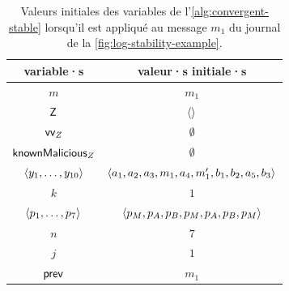 \begin{table}[ht]
    \centering
    \begin{tabular}{cc}
        variable·s & valeur·s initiale·s \\
        \toprule
        $m$ & $m_1$ \\
        $\trm{Z}$ & $\tuple*{}$ \\
        $\trm{vv}_Z$ & $\emptyset$ \\
        $\trm{knownMalicious}_Z$ & $\emptyset$ \\
        $\tuple*{y_1, \dotsc, y_{10}}$ & $\tuple*{a_1, a_2, a_3, m_1, a_4, m_1', b_1, b_2, a_5, b_3}$ \\
        $k$ & $1$ \\
        $\tuple*{p_1, \dotsc, p_{7}}$ & $\tuple*{p_M, p_A, p_B, p_M, p_A, p_B, p_M}$ \\
        $n$ & $7$ \\
        $j$ & $1$ \\
        $\trm{prev}$ & $m_1$ \\
    \end{tabular}
    \caption{Valeurs initiales des variables de l'\autoref{alg:convergent-stable} lorsqu'il est appliqué au message $m_1$ du journal de la \autoref{fig:log-stability-example}.}\label{tab:log-stability-example-algo-const}
\end{table}


